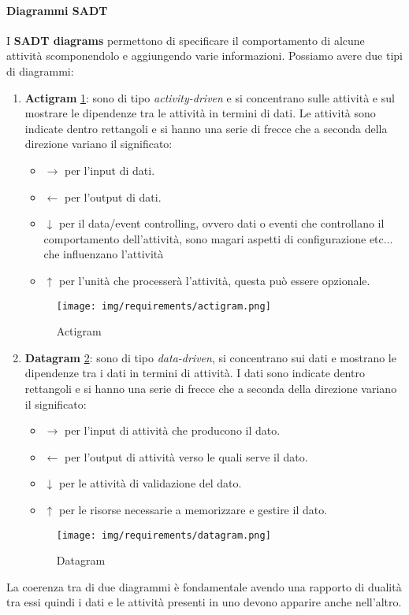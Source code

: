 \paragraph{Diagrammi SADT}
I \textbf{SADT diagrams} permettono di specificare il comportamento di alcune attività scomponendolo e aggiungendo varie informazioni. Possiamo avere due tipi di diagrammi:
\begin{enumerate}
    \item \textbf{Actigram} \ref{fig:actigram}: sono di tipo \textit{activity-driven} e si concentrano sulle attività e sul mostrare le dipendenze tra le attività in termini di dati. Le attività sono indicate dentro rettangoli e si hanno una serie di frecce che a seconda della direzione variano il significato:
    \begin{itemize}
        \item $\to$ per l'input di dati.
        \item $\gets$ per l'output di dati.
        \item $\downarrow$ per il data/event controlling, ovvero dati o eventi che controllano il comportamento dell'attività, sono magari aspetti di configurazione etc$\dots$ che influenzano l'attività
        \item $\uparrow$ per l'unità che processerà l'attività, questa può essere opzionale.
    \end{itemize}
    \begin{figure}[!ht]
        \centering
        \texttt{[image: img/requirements/actigram.png]}
        \caption{Actigram}
        \label{fig:actigram}
    \end{figure}
    \item \textbf{Datagram} \ref{fig:datagram}: sono di tipo \textit{data-driven}, si concentrano sui dati e mostrano le dipendenze tra i dati in termini di attività. I dati sono indicate dentro rettangoli e si hanno una serie di frecce che a seconda della direzione variano il significato:
    \begin{itemize}
        \item $\to$ per l'input di attività che producono il dato.
        \item $\gets$ per l'output di attività verso le quali serve il dato.
        \item $\downarrow$ per le attività di validazione del dato.
        \item $\uparrow$ per le risorse necessarie a memorizzare e gestire il dato.
    \end{itemize}
    \begin{figure}[!ht]
        \centering
        \texttt{[image: img/requirements/datagram.png]}
        \caption{Datagram}
        \label{fig:datagram}
    \end{figure}
\end{enumerate}
La coerenza tra di due diagrammi è fondamentale avendo una rapporto di dualità tra essi quindi i dati e le attività presenti in uno devono apparire anche nell'altro.

